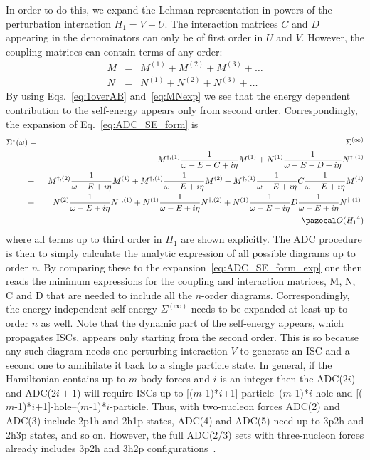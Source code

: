 In order to do this, we expand the Lehman representation in powers of the perturbation interaction $H_1=V-U$. The interaction matrices 
$C$ and $D$ appearing in the denominators can only be of first order in $U$ and $V$. However, the coupling matrices can contain terms
of any order:
\begin{eqnarray}
  M &=& M^{(1)} +  M^{(2)} +  M^{(3)} +  \ldots
   \nonumber  \\
  N &=&  N^{(1)} +  N^{(2)} +  N^{(3)} + \ldots
 \label{eq:MNexp}
\end{eqnarray}
By using  Eqs.~\eqref{eq:1overAB}  and~\eqref{eq:MNexp} we see that the energy dependent
contribution to the self-energy appears only  from  second order. Correspondingly, the expansion
of Eq.~\ref{eq:ADC_SE_form} is
\begin{eqnarray}
  \Sigma^{\star}(\omega) &=&  \Sigma^{(\infty)}
  \nonumber \\
   &+& M^{\dagger,(1)}\frac1{\omega - E -C + i \eta}M^{(1)} +N^{(1)}\frac1{\omega - E -D + i \eta}N^{\dagger,(1)}
    \nonumber \\
  &+&~ M^{\dagger,(2)}\frac1{\omega - E + i \eta}M^{(1)}  +   M^{\dagger,(1)}\frac1{\omega - E + i \eta}M^{(2)}
 +  M^{\dagger,(1)}\frac1{\omega - E + i \eta} C \frac1{\omega - E + i \eta}M^{(1)}  
    \nonumber \\
  &+&~ N^{(2)}\frac1{\omega - E + i \eta}N^{\dagger,(1)}  +   N^{(1)}\frac1{\omega - E + i \eta}N^{\dagger,(2)}
 +  N^{(1)}\frac1{\omega - E + i \eta} D \frac1{\omega - E + i \eta}N^{\dagger,(1)}  \
 \nonumber \\
 &+&   {\pazocal O}({ H_1}^4)
 \label{eq:ADC_SE_form_exp}
\end{eqnarray}
where all terms up to third order in $H_1$ are shown explicitly.
The ADC procedure is then to simply calculate the analytic expression of all possible diagrams up
to order $n$. By comparing these to the expansion~\eqref{eq:ADC_SE_form_exp} one then reads
the minimum expressions for the coupling and interaction matrices, M, N, C and D that are needed to
include all the $n$-order diagrams. Correspondingly, the energy-independent self-energy $\Sigma^{(\infty)}$
needs to be expanded at least up to order $n$ as well.
 Note that the dynamic part of the self-energy appears, which propagates ISCs, appears only starting from the
 second order. This is so because any such diagram needs one perturbing interaction $V$ to generate an ISC
 and a second one to annihilate it back to a single particle state. In general, if the Hamiltonian contains
 up to $m$-body forces and $i$ is an integer then the ADC($2i$) and ADC($2i+1$) will require
 ISCs up to  [($m$-1)*$i$+1]-particle--($m$-1)*$i$-hole and [($m$-1)*$i$+1]-hole--($m$-1)*$i$-particle.
 Thus, with two-nucleon forces ADC(2) and ADC(3) include  2p1h and 2h1p states,  ADC(4) and ADC(5) need up to 
 3p2h and 2h3p states, and so on. However, the full ADC(2/3) sets with three-nucleon forces already
 includes 3p2h and 3h2p configurations~\cite{Raimondi_inprep}.

